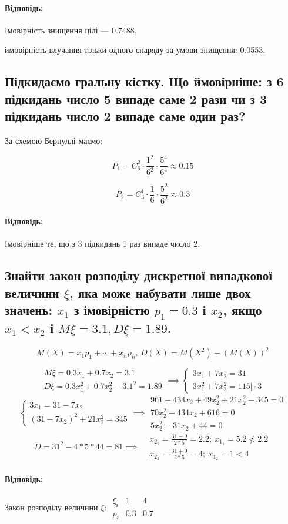 \documentclass[a4paper, 12pt, oneside]{extarticle}
\newcommand{\Problem}{\subsection}
\newcommand{\Answer}[1]{
\medskip
\null\hfill
\begin{boxedminipage}{\textwidth}
	\paragraph{Відповідь: }{#1}
\end{boxedminipage}
}
\begin{document}
\Answer{Імовірність знищення цілі --- 0.7488,

ймовірність влучання тільки одного снаряду за умови знищення: 0.0553.}

\Problem{
	Підкидаємо гральну кістку. Що ймовірніше: з 6 підкидань число 5 випаде саме 2 рази чи з 3 підкидань число 2 випаде саме один раз?
}

За схемою Бернуллі маємо:

$$
P_1 =
C_6^2
\cdot
\frac{1^2}{6^2}
\cdot
\frac{5^4}{6^4}
\approx 0.15
$$


$$
P_2 =
C_3^1
\cdot
\frac{1}{6}
\cdot
\frac{5^2}{6^2}
\approx 0.3
$$


\Answer{Імовірніше те, що з 3 підкидань 1 раз випаде число 2.}

\Problem{
	Знайти закон розподілу дискретної випадкової величини $\xi$, яка може набувати лише двох значень: $x_1$ з імовірністю
	$p_1=0.3$ і
	$x_2$, якщо $x_1<x_2$ і
	$M\xi=3.1, D\xi=1.89$.
}

$$
M(X) = x_1p_1 + \cdots + x_n p_n,\,
D(X)=M(X^2)-(M(X))^2
$$

$$
\begin{aligned}
	M\xi=0.3x_1+0.7x_2 = 3.1 \\
	D\xi=0.3x_1^2 + 0.7x_2^2 - 3.1^2 = 1.89
\end{aligned}
\implies
\begin{cases}
	3x_1+7x_2 = 31 \\
	3x_1^2 + 7x_2^2 = 115 \big| \cdot 3
\end{cases}
$$
$$
\begin{cases}
	3x_1 = 31-7x_2 \\
	(31-7x_2)^2 + 21x_2^2 = 345
\end{cases}
\implies
\begin{aligned}
	961-434x_2+49x_2^2+21x_2^2-345=0 \\
	70x_2^2-434x_2+616=0 \\
	5x_2^2-31x_2+44=0
\end{aligned}
$$
$$
D = 31^2-4*5*44 = 81
\implies
\begin{aligned}
	&x_{2_1} = \frac{31-9}{2*5} = 2.2;\ x_{1_1}=5.2 \not< 2.2 \\
	&x_{2_2} = \frac{31+9}{2*5} = 4;\ x_{1_2}=1 < 4
\end{aligned}
$$
\Answer{
Закон розподілу величини $\xi$:
$
\begin{array}{ccc}
	\xi_i & 1 & 4 \\
	p_i & 0.3 & 0.7
\end{array}
$
}
\end{document}
